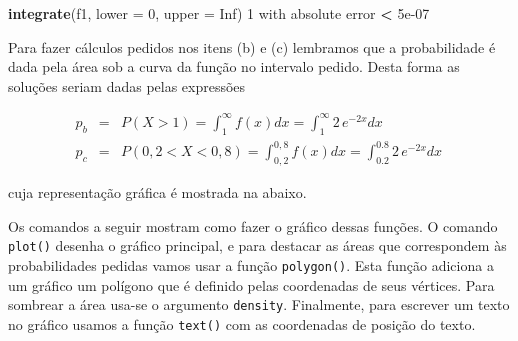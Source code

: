 \documentclass[10pt,a4paper]{book}
\newenvironment{Shaded}{\begin{snugshade}}{\end{snugshade}}
\newcommand{\KeywordTok}[1]{\textcolor[rgb]{0.13,0.29,0.53}{\textbf{#1}}}
\newcommand{\DataTypeTok}[1]{\textcolor[rgb]{0.13,0.29,0.53}{#1}}
\newcommand{\DecValTok}[1]{\textcolor[rgb]{0.00,0.00,0.81}{#1}}
\newcommand{\FloatTok}[1]{\textcolor[rgb]{0.00,0.00,0.81}{#1}}
\newcommand{\StringTok}[1]{\textcolor[rgb]{0.31,0.60,0.02}{#1}}
\newcommand{\OtherTok}[1]{\textcolor[rgb]{0.56,0.35,0.01}{#1}}
\newcommand{\OperatorTok}[1]{\textcolor[rgb]{0.81,0.36,0.00}{\textbf{#1}}}
\newcommand{\NormalTok}[1]{#1}
\begin{document}
\begin{Shaded}
\begin{Highlighting}[]
\KeywordTok{integrate}\NormalTok{(f1, }\DataTypeTok{lower =} \DecValTok{0}\NormalTok{, }\DataTypeTok{upper =} \OtherTok{Inf}\NormalTok{)}
\DecValTok{1}\NormalTok{ with absolute error }\OperatorTok{<}\StringTok{ }\FloatTok{5e-07}
\end{Highlighting}
\end{Shaded}

Para fazer cálculos pedidos nos itens (b) e (c) lembramos que a
probabilidade é dada pela área sob a curva da função no intervalo
pedido. Desta forma as soluções seriam dadas pelas expressões

\begin{eqnarray*}
 p_b & = & P(X > 1) = \int_1^\infty f(x) dx = \int_1^\infty 2\,e^{-2x} dx \\
 p_c & = & P(0,2 < X < 0,8) = \int_{0,2}^{0,8} f(x) dx = \int_{0.2}^{0.8} 2\,e^{-2x} dx \,
\end{eqnarray*}

cuja representação gráfica é mostrada na abaixo.

Os comandos a seguir mostram como fazer o gráfico dessas funções. O
comando \texttt{plot()} desenha o gráfico principal, e para destacar as
áreas que correspondem às probabilidades pedidas vamos usar a função
\texttt{polygon()}. Esta função adiciona a um gráfico um polígono que é
definido pelas coordenadas de seus vértices. Para sombrear a área usa-se
o argumento \texttt{density}. Finalmente, para escrever um texto no
gráfico usamos a função \texttt{text()} com as coordenadas de posição do
texto.
\end{document}
